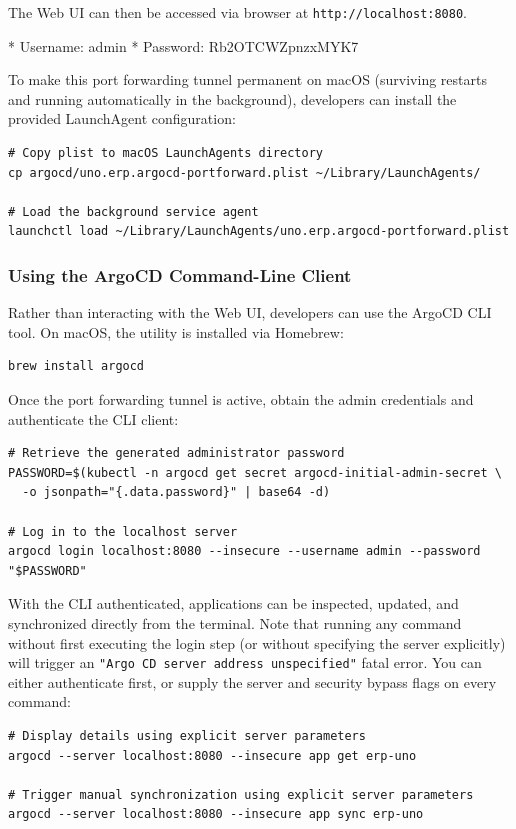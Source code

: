 \documentclass{article}
\begin{document}
The Web UI can then be accessed via browser at \texttt{http://localhost:8080}.

* Username: admin
* Password: Rb2OTCWZpnzxMYK7

To make this port forwarding tunnel permanent on macOS (surviving restarts and running automatically in the background),
developers can install the provided LaunchAgent configuration:

\begin{verbatim}
# Copy plist to macOS LaunchAgents directory
cp argocd/uno.erp.argocd-portforward.plist ~/Library/LaunchAgents/

# Load the background service agent
launchctl load ~/Library/LaunchAgents/uno.erp.argocd-portforward.plist
\end{verbatim}

\subsubsection{Using the ArgoCD Command-Line Client}

Rather than interacting with the Web UI, developers can use the ArgoCD CLI tool. On macOS, the utility is installed via Homebrew:
\begin{verbatim}
brew install argocd
\end{verbatim}

Once the port forwarding tunnel is active, obtain the admin credentials and authenticate the CLI client:
\begin{verbatim}
# Retrieve the generated administrator password
PASSWORD=$(kubectl -n argocd get secret argocd-initial-admin-secret \
  -o jsonpath="{.data.password}" | base64 -d)

# Log in to the localhost server
argocd login localhost:8080 --insecure --username admin --password "$PASSWORD"
\end{verbatim}

With the CLI authenticated, applications can be inspected, updated, and synchronized directly from the terminal. Note that running any command without first executing the login step (or without specifying the server explicitly) will trigger an \texttt{"Argo CD server address unspecified"} fatal error. You can either authenticate first, or supply the server and security bypass flags on every command:
\begin{verbatim}
# Display details using explicit server parameters
argocd --server localhost:8080 --insecure app get erp-uno

# Trigger manual synchronization using explicit server parameters
argocd --server localhost:8080 --insecure app sync erp-uno
\end{verbatim}
\end{document}
